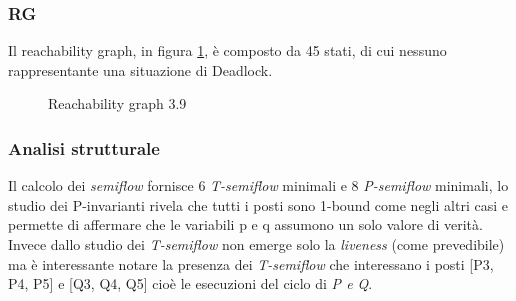 \documentclass[a4paper]{article}
\begin{document}
\subsubsection{RG}
Il reachability graph, in figura \ref{FIG:3.9RG}, è composto da 45 stati, di cui nessuno rappresentante una situazione di Deadlock.
\begin{figure}[!ht]
\centering
{}
\caption{Reachability graph 3.9} \label{FIG:3.9RG}
\end{figure}
\newpage
\subsubsection{Analisi strutturale} 
\label{SEC:3_9_strutturale}
Il calcolo dei \textit{semiflow} fornisce 6 \textit{T-semiflow} minimali e 8 \textit{P-semiflow} minimali, lo studio dei P-invarianti rivela che tutti i posti sono 1-bound come negli altri casi e permette di affermare che le variabili p e q assumono un solo valore di verità.
Invece dallo studio dei \textit{T-semiflow} non emerge solo la \textit{liveness} (come prevedibile) ma è interessante notare la presenza dei \textit{T-semiflow} che interessano i posti [P3, P4, P5] e [Q3, Q4, Q5] cioè le esecuzioni del ciclo di \textit{P \textit{e} Q}.
\end{document}
